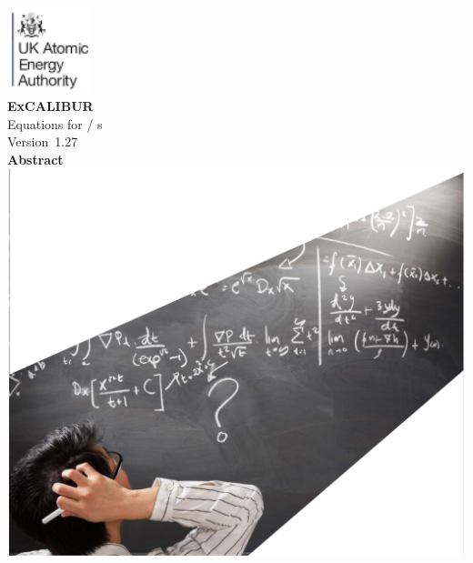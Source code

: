\documentclass[11pt,twoside,a4paper]{article}
\newcommand{\culhamissueno}{1.27}%
\newcommand{\culhamtitle}{\LARGE Equations for \exc/\nep \; \Papp s  \\[1.0\baselineskip] Version~\culhamissueno }%
\begin{document}
\begin{titlepage}
\includegraphics[width=2.5cm]{../corpics/cofaplus} \\[2.0\baselineskip]
{\LARGE {\textbf{\textsf{ExCALIBUR}}}}\\[2.0\baselineskip]
{\LARGE \culhamtitle } \\[2.0\baselineskip]
{\textbf{\textsf{Abstract}}}\\

\vspace*{-100mm}
\hspace{-50mm}\includegraphics[width=22.0cm]{../corpics/eqs1}
\end{titlepage}

\clearpage
%
\end{document}
